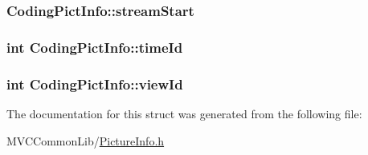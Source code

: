 \label{struct_coding_pict_info_afeeb373571d44e64d473524e6127f3f7}
\hypertarget{struct_coding_pict_info_a589da1ebbfa6493b63005412ce79dac6}{
\subsubsection[{streamStart}]{ {\bf CodingPictInfo::streamStart}}}
\label{struct_coding_pict_info_a589da1ebbfa6493b63005412ce79dac6}
\hypertarget{struct_coding_pict_info_ad85dae4751165ea3cbb8f7b8c6e61dc3}{
\subsubsection[{timeId}]{\setlength{\rightskip}{0pt plus 5cm}int {\bf CodingPictInfo::timeId}}}
\label{struct_coding_pict_info_ad85dae4751165ea3cbb8f7b8c6e61dc3}
\hypertarget{struct_coding_pict_info_a987595091bfba91b3166b04bca988697}{
\subsubsection[{viewId}]{\setlength{\rightskip}{0pt plus 5cm}int {\bf CodingPictInfo::viewId}}}
\label{struct_coding_pict_info_a987595091bfba91b3166b04bca988697}


The documentation for this struct was generated from the following file:\begin{DoxyCompactItemize}
\item 
MVCCommonLib/\hyperlink{_picture_info_8h}{PictureInfo.h}\end{DoxyCompactItemize}
